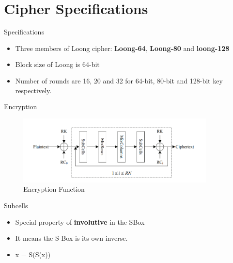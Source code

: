 \section{Cipher Specifications}

\begin{frame}{Specifications}
    \begin{itemize}
        \item Three members of Loong cipher: \textbf{Loong-64}, \textbf{Loong-80} and \textbf{loong-128}
        \pause
        \item Block size of Loong is 64-bit
        \pause
        \item Number of rounds are 16, 20 and 32 for 64-bit, 80-bit and 128-bit key respectively.
    \end{itemize}
\end{frame}

\begin{frame}{Encryption}
    \begin{figure}[htp]
    \centering
    \includegraphics[width=10cm]{encrypt.png}
    \caption{Encryption Function}
    \label{fig:encryption-function}
    \end{figure}
\end{frame}

\begin{frame}{Subcells}
    \begin{table}[H]
    	\begin{center}
    	\end{center}
    	\caption{S-Box}
    	\label{table:sbox}
    \end{table}
    \begin{itemize}
        \item Special property of \textbf{involutive} in the SBox
        \pause
        \item It means the S-Box is its own inverse.
        \pause
        \item x = S(S(x))
    \end{itemize}
\end{frame}
    
